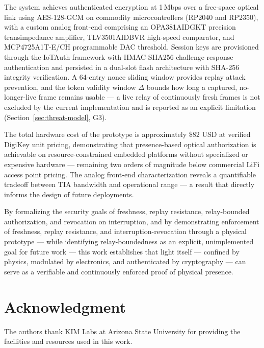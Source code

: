 \documentclass[conference]{IEEEtran}
\begin{document}
The system achieves authenticated encryption at 1\,Mbps over a free-space optical link using AES-128-GCM on commodity microcontrollers (RP2040 and RP2350), with a custom analog front-end comprising an OPA381AIDGKT precision transimpedance amplifier, TLV3501AIDBVR high-speed comparator, and MCP4725A1T-E/CH programmable DAC threshold. Session keys are provisioned through the IoTAuth framework with HMAC-SHA256 challenge-response authentication and persisted in a dual-slot flash architecture with SHA-256 integrity verification. A 64-entry nonce sliding window provides replay attack prevention, and the token validity window $\Delta$ bounds how long a captured, no-longer-live frame remains usable — a live relay of continuously fresh frames is not excluded by the current implementation and is reported as an explicit limitation (Section~\ref{sec:threat-model}, G3).

The total hardware cost of the prototype is approximately \$82 USD at verified DigiKey unit pricing, demonstrating that presence-based optical authorization is achievable on resource-constrained embedded platforms without specialized or expensive hardware --- remaining two orders of magnitude below commercial LiFi access point pricing. The analog front-end characterization reveals a quantifiable tradeoff between TIA bandwidth and operational range --- a result that directly informs the design of future deployments.

By formalizing the security goals of freshness, replay resistance, relay-bounded authorization, and revocation on interruption, and by demonstrating enforcement of freshness, replay resistance, and interruption-revocation through a physical prototype — while identifying relay-boundedness as an explicit, unimplemented goal for future work — this work establishes that light itself --- confined by physics, modulated by electronics, and authenticated by cryptography --- can serve as a verifiable and continuously enforced proof of physical presence.

\section*{Acknowledgment}

The authors thank KIM Labs at Arizona State University for providing the facilities and resources used in this work.
\end{document}
